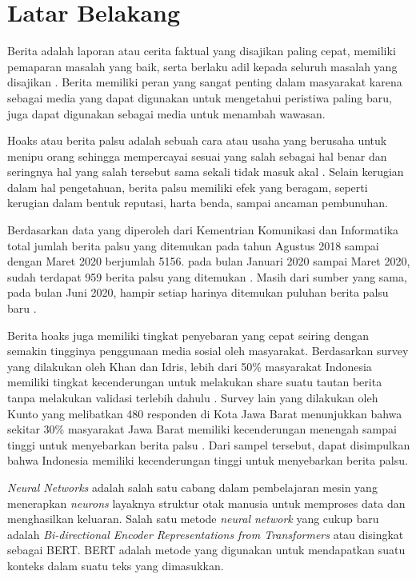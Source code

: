 \section{Latar Belakang}
\label{sec:latarbelakang}

Berita adalah laporan atau cerita faktual yang disajikan paling cepat, memiliki pemaparan masalah yang baik, serta berlaku adil kepada seluruh masalah yang disajikan \cite{rani2013persepsi}. Berita memiliki peran yang sangat penting dalam masyarakat karena sebagai media yang dapat digunakan untuk mengetahui peristiwa paling baru, juga dapat digunakan sebagai media untuk menambah wawasan.

Hoaks atau berita palsu adalah sebuah cara atau usaha yang berusaha untuk menipu orang sehingga mempercayai sesuai yang salah sebagai hal benar dan seringnya hal yang salah tersebut sama sekali tidak masuk akal \cite{berita_bohong}. Selain kerugian dalam hal pengetahuan, berita palsu memiliki efek yang beragam, seperti kerugian dalam bentuk reputasi, harta benda, sampai ancaman pembunuhan.

Berdasarkan data yang diperoleh dari Kementrian Komunikasi dan Informatika total jumlah berita palsu yang ditemukan pada tahun Agustus 2018 sampai dengan Maret 2020 berjumlah 5156. pada bulan Januari 2020 sampai Maret 2020, sudah terdapat 959 berita palsu yang ditemukan \cite{kominfoStatHoax}. Masih dari sumber yang sama, pada bulan Juni 2020, hampir setiap harinya ditemukan puluhan berita palsu baru \cite{kominfoJuni2020}.

Berita hoaks juga memiliki tingkat penyebaran yang cepat seiring dengan semakin tingginya penggunaan media sosial oleh masyarakat. Berdasarkan survey yang dilakukan oleh Khan dan Idris, lebih dari 50\% masyarakat Indonesia memiliki tingkat kecenderungan untuk melakukan share suatu tautan berita tanpa melakukan validasi terlebih dahulu \cite{khan}. Survey lain yang dilakukan oleh Kunto yang melibatkan 480 responden di Kota Jawa Barat menunjukkan bahwa sekitar 30\% masyarakat Jawa Barat memiliki kecenderungan menengah sampai tinggi untuk menyebarkan berita palsu \cite{kuntoUmur}. Dari sampel tersebut, dapat disimpulkan bahwa Indonesia memiliki kecenderungan tinggi untuk menyebarkan berita palsu.

\textit{Neural Networks} adalah salah satu cabang dalam pembelajaran mesin yang menerapkan \textit{neurons} layaknya struktur otak manusia untuk memproses data dan menghasilkan keluaran. Salah satu metode \textit{neural network} yang cukup baru adalah \textit{Bi-directional Encoder Representations from Transformers} atau disingkat sebagai BERT. BERT adalah metode yang digunakan untuk mendapatkan suatu konteks dalam suatu teks yang dimasukkan.

